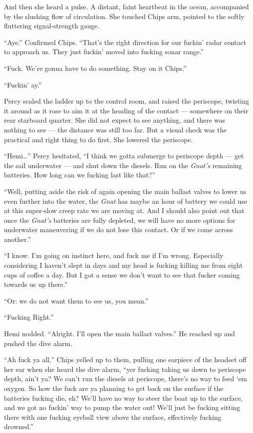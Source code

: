 \documentclass[]{scrbook}
\begin{document}
And then she heard a pulse. A distant, faint heartbeat in the ocean,
accompanied by the slushing flow of circulation. She touched Chips arm,
pointed to the softly fluttering signal-strength gauge.

``Aye.'' Confirmed Chips. ``That's the right direction for our fuckin'
radar contact to approach us. They just fuckin' moved into fucking sonar
range.''

``Fuck. We're gonna have to do something. Stay on it Chips.''

``Fuckin' ay.''

Percy scaled the ladder up to the control room, and raised the
periscope, twisting it around as it rose to aim it at the heading of the
contact --- somewhere on their rear starboard quarter. She did not
expect to see anything, and there was nothing to see --- the distance
was still too far. But a visual check was the practical and right thing
to do first. She lowered the periscope.

``Hemi\ldots{}'' Percy hesitated, ``I think we gotta submerge to
periscope depth --- get the sail underwater --- and shut down the
diesels. Run on the \emph{Gnat's} remaining batteries. How long can we
fucking last like that?''

``Well, putting aside the risk of again opening the main ballast valves
to lower us even further into the water, the \emph{Gnat} has maybe an
hour of battery we could use at this super-slow creep rate we are moving
at. And I should also point out that once the \emph{Gnat's} batteries
are fully depleted, we will have no more options for underwater
maneuvering if we do not lose this contact. Or if we come across
another.''

``I know. I'm going on instinct here, and fuck me if I'm wrong.
Especially considering I haven't slept in days and my head is fucking
killing me from eight cups of coffee a day. But I got a sense we don't
want to see that fucker coming towards us up there.''

``Or: we do not want them to see us, you mean.''

``Fucking Right.''

Hemi nodded. ``Alright. I'll open the main ballast valves.'' He reached
up and pushed the dive alarm.

``Ah fuck ya all,'' Chips yelled up to them, pulling one earpiece of the
headset off her ear when she heard the dive alarm, ``yer fucking taking
us down to periscope depth, ain't ya? We can't run the diesels at
periscope, there's no way to feed `em oxygen. So how the fuck are ya
planning to get back on the surface if the batteries fucking die, eh?
We'll have no way to steer the boat up to the surface, and we got no
fuckin' way to pump the water out! We'll just be fucking sitting there
with one fucking eyeball view above the surface, effectively fucking
drowned.''
\end{document}
